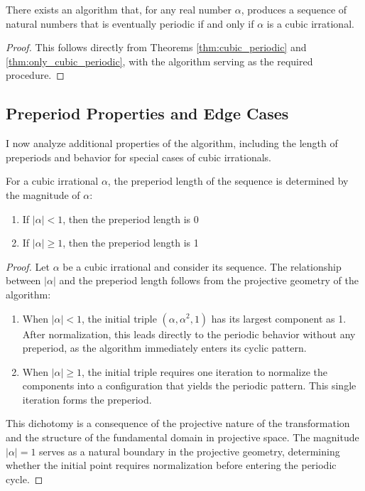 \begin{theorem}\label{thm:main_result}
There exists an algorithm that, for any real number $\alpha$, produces a sequence of natural numbers that is eventually periodic if and only if $\alpha$ is a cubic irrational.
\end{theorem}

\begin{proof}
This follows directly from Theorems \ref{thm:cubic_periodic} and \ref{thm:only_cubic_periodic}, with the \HAPD{} algorithm serving as the required procedure.
\end{proof}

\subsection{Preperiod Properties and Edge Cases}

I now analyze additional properties of the \HAPD{} algorithm, including the length of preperiods and behavior for special cases of cubic irrationals.

\begin{theorem}\label{thm:preperiod}
For a cubic irrational $\alpha$, the preperiod length of the \HAPD{} sequence is determined by the magnitude of $\alpha$:
\begin{enumerate}
    \item If $|\alpha| < 1$, then the preperiod length is 0
    \item If $|\alpha| \geq 1$, then the preperiod length is 1
\end{enumerate}
\end{theorem}

\begin{proof}
Let $\alpha$ be a cubic irrational and consider its \HAPD{} sequence. The relationship between $|\alpha|$ and the preperiod length follows from the projective geometry of the algorithm:

\begin{enumerate}
    \item When $|\alpha| < 1$, the initial triple $(\alpha, \alpha^2, 1)$ has its largest component as 1. After normalization, this leads directly to the periodic behavior without any preperiod, as the algorithm immediately enters its cyclic pattern.
    
    \item When $|\alpha| \geq 1$, the initial triple requires one iteration to normalize the components into a configuration that yields the periodic pattern. This single iteration forms the preperiod.
\end{enumerate}

This dichotomy is a consequence of the projective nature of the \HAPD{} transformation and the structure of the fundamental domain in projective space. The magnitude $|\alpha| = 1$ serves as a natural boundary in the projective geometry, determining whether the initial point requires normalization before entering the periodic cycle.
\end{proof}

